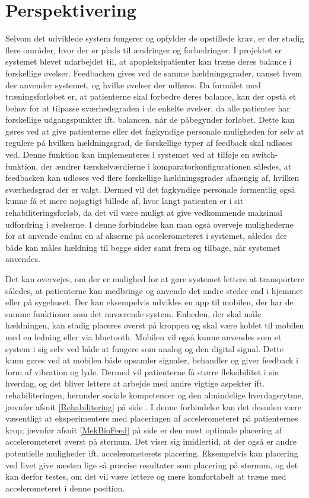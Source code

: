 \section{Perspektivering}
Selvom det udviklede system fungerer og opfylder de opstillede krav, er der stadig flere områder, hvor der er plads til ændringer og forbedringer. 
I projektet er systemet blevet udarbejdet til, at apopleksipatienter kan træne deres balance i forskellige øvelser. Feedbacken gives ved de samme hældningsgrader, uanset hvem der anvender systemet, og hvilke øvelser der udføres. Da formålet med træningsforløbet er, at patienterne skal forbedre deres balance, kan der opstå et behov for at tilpasse sværhedsgraden i de enkelte øvelser, da alle patienter har forskellige udgangspunkter ift. balancen, når de påbegynder forløbet. Dette kan gøres ved at give patienterne eller det fagkyndige personale muligheden for selv at regulere på hvilken hældningsgrad, de forskellige typer af feedback skal udløses ved. Denne funktion kan implementeres i systemet ved at tilføje en switch-funktion, der ændrer tærskelværdierne i komparatorkonfigurationen således, at feedbacken kan udløses ved flere forskellige hældningsgrader afhængig af, hvilken sværhedsgrad der er valgt. Dermed vil det fagkyndige personale formentlig også kunne få et mere nøjagtigt billede af, hvor langt patienten er i sit rehabiliteringsforløb, da det vil være muligt at give vedkommende maksimal udfordring i øvelserne. I denne forbindelse kan man også overveje mulighederne for at anvende endnu en af akserne på accelerometeret i systemet, således der både kan måles hældning til begge sider samt frem og tilbage, når systemet anvendes.

Det kan overvejes, om der er mulighed for at gøre systemet lettere at transportere således, at patienterne kan medbringe og anvende det andre steder end i hjemmet eller på sygehuset. Der kan eksempelvis udvikles en app til mobilen, der har de samme funktioner som det nuværende system. Enheden, der skal måle hældningen, kan stadig placeres øverst på kroppen og skal være koblet til mobilen med en ledning eller via bluetooth. Mobilen vil også kunne anvendes som et system i sig selv ved både at fungere som analog og den digital signal. Dette kunn gøres ved at mobilen både opsamler signaler, behandler og giver feedback i form af vibration og lyde. Dermed vil patienterne få større fleksibilitet i sin hverdag, og det bliver lettere at arbejde med andre vigtige aspekter ift. rehabiliteringen, herunder sociale kompetencer og den almindelige hverdagsrytme, jævnfør afsnit \ref{Rehabilitering} på side \pageref{Rehabilitering}. I denne forbindelse kan det desuden være væsentligt at eksperimentere med placeringen af accelerometeret på patienternes krop; jævnfør afsnit \ref{MekBioFeed} på side \pageref{MekBioFeed} er den mest optimale placering af accelerometeret øverst på sternum. Det viser sig imidlertid, at der også er andre potentielle muligheder ift. accelerometerets placering. Eksempelvis kan placering ved livet give næsten lige så præcise resultater som placering på sternum, og det kan derfor testes, om det vil være lettere og mere komfortabelt at træne med accelerometeret i denne position\cite{Gjoreski2011}.

